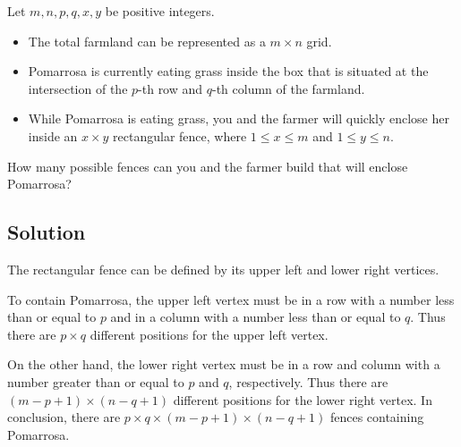 \documentclass{article}
\begin{document}
    \vspace{1.5mm}
    Let $m, n, p, q, x, y$ be positive integers. 
    \begin{itemize}
        \item The total farmland can be represented as a $m \times n$ grid.
        \item Pomarrosa is currently eating grass inside the box that is situated at the intersection of the $p$-th row and $q$-th column of the farmland.
        \item While Pomarrosa is eating grass, you and the farmer will quickly enclose her inside an $x \times y$ rectangular fence, where $1 \le x \le m$ and $1 \le y \le n$.
    \end{itemize}
    How many possible fences can you and the farmer build that will enclose Pomarrosa?

\subsection*{Solution}
    The rectangular fence can be defined by its upper left and lower right vertices. 
    
    \vspace{1mm}\qquad To contain Pomarrosa, the upper left vertex must be in a row with a number less than or equal to $p$ and in a column with a number less than or equal to $q$. Thus there are $p \times q$ different positions for the upper left vertex. 
    
    \vspace{1mm}\qquad On the other hand, the lower right vertex must be in a row and column with a number greater than or equal to $p$ and $q$, respectively. Thus there are $(m - p + 1) \times (n - q + 1)$ different positions for the lower right vertex. In conclusion, there are $p \times q \times (m - p + 1) \times (n - q + 1)$ fences containing Pomarrosa.
\end{document}
